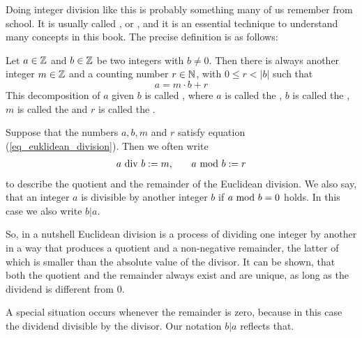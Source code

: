Doing integer division like this is probably something many of us remember from school. It is 
usually called , or , and it is an essential technique to understand many concepts in this book. The precise definition is as follows:

Let $ a \in \mathbb{Z} $ and $ b \in \mathbb{Z} $ be two integers with $b\neq 0$. Then there is always another integer $ m \in \mathbb{Z} $ and a counting number $ r \in \mathbb{N} $, with $ 0 \leq r <|b| $ such that
\begin{equation}
\label{eq_euklidean_division}
a = m \cdot b + r
\end{equation}
This decomposition of $a$ given $b$ is called , where $ a $ is called the , $ b $ is called the , $m$ is called the  and $r$ is called the . 
\begin{notation}
\label{eq_euklidean_division_notation}
Suppose that the numbers $ a, b, m $ and $ r $ satisfy equation (\ref{eq_euklidean_division}). Then we often write 
\begin{equation}
\label{def_integer_division_and_modulus}
\begin{array}{lcr}
a \text{ div } b: = m, & & a \text{ mod } b: = r 
\end{array}
\end{equation}
to describe the quotient and the remainder of the Euclidean division. We also say, that an integer $ a $ is divisible by another integer $ b $ if $ a \text{ mod } b = 0 $ holds. In this case we also write $ b | a $.
\end{notation}
So, in a nutshell Euclidean division is a process of dividing one integer by another in a way that produces a quotient and a non-negative remainder, the latter of which is smaller than the absolute value of the divisor. It can be shown, that both the quotient and the remainder always exist and are unique, as long as the dividend is different from $0$.

A special situation occurs whenever the remainder is zero, because in this case the dividend  divisible by the divisor. Our notation $b | a$ reflects that. 



